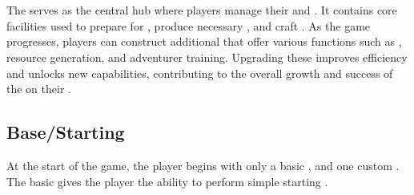 \chapter{}

The  serves as the central hub where players manage their  and . It contains core facilities used to prepare  for , produce necessary , and craft . As the game progresses, players can construct additional  that offer various functions such as , resource generation, and adventurer training. Upgrading these  improves efficiency and unlocks new capabilities, contributing to the overall growth and success of the  on their .

\section{Base/Starting }

At the start of the game, the player begins with only a basic , and one custom . The basic  gives the player the ability to perform simple starting .

\section{}

\subsection{}

\subsection{}

\subsection{}

\subsection{}

